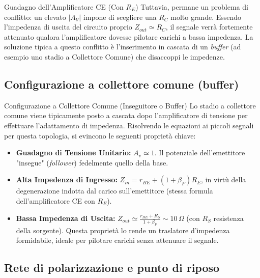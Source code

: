 \begin{teorema}{Guadagno dell'Amplificatore CE (Con $R_E$)}
    \vspace{0.2cm}
    Tuttavia, permane un problema di conflitto: un elevato $|A_V|$ impone di scegliere una $R_C$ molto grande. Essendo l'impedenza di uscita del circuito proprio $Z_{out} \simeq R_C$, il segnale verrà fortemente attenuato qualora l'amplificatore dovesse pilotare carichi a bassa impedenza. La soluzione tipica a questo conflitto è l'inserimento in cascata di un \emph{buffer} (ad esempio uno stadio a Collettore Comune) che disaccoppi le impedenze.
\end{teorema}

\subsection{Configurazione a collettore comune (buffer)}

\begin{osservazione}{Configurazione a Collettore Comune (Inseguitore o Buffer)}
    Lo stadio a collettore comune viene tipicamente posto a cascata dopo l'amplificatore di tensione per effettuare l'adattamento di impedenza. Risolvendo le equazioni ai piccoli segnali per questa topologia, si evincono le seguenti proprietà chiave:
    \begin{itemize}[label=$\cdot$, leftmargin=*]
        \item \textbf{Guadagno di Tensione Unitario:} $A_v \simeq 1$. Il potenziale dell'emettitore "insegue" (\emph{follower}) fedelmente quello della base.
        \item \textbf{Alta Impedenza di Ingresso:} $Z_{in} = r_{BE} + (1+\beta_F)R_E$, in virtù della degenerazione indotta dal carico sull'emettitore (stessa formula dell'amplificatore CE con $R_E$).
        \item \textbf{Bassa Impedenza di Uscita:} $Z_{out} \simeq \frac{r_{BE} + R_S}{1+\beta_F} \sim 10\,\Omega$ (con $R_S$ resistenza della sorgente). Questa proprietà lo rende un traslatore d'impedenza formidabile, ideale per pilotare carichi senza attenuare il segnale.
    \end{itemize}
\end{osservazione}

\vspace{0.3cm}
\subsection{Rete di polarizzazione e punto di riposo}

